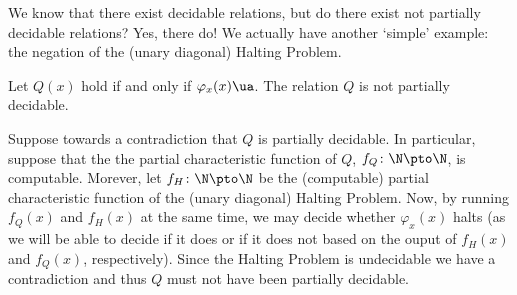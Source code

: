 \documentclass[class=article, crop=false]{standalone}
\begin{document}
We know that there exist decidable relations, but do there exist not partially decidable relations? Yes, there do! We actually have another `simple' example: the negation of the (unary diagonal) Halting Problem.
\begin{ex}
  Let $Q(x)$ hold if and only if $\varphi_x(x) \ua$. The relation $Q$ is not partially decidable.

  \begin{pf}
    Suppose towards a contradiction that $Q$ is partially decidable. In particular, suppose that the the partial characteristic function of $Q$, $f_Q \colon \N \pto \N$, is computable. Morever, let $f_H \colon \N \pto \N$ be the (computable) partial characteristic function of the (unary diagonal) Halting Problem. Now, by running $f_Q(x)$ and $f_H(x)$ at the same time, we may decide whether $\varphi_x(x)$ halts (as we will be able to decide if it does or if it does not based on the ouput of $f_H(x)$ and $f_Q(x)$, respectively). Since the Halting Problem is undecidable we have a contradiction and thus $Q$ must not have been partially decidable.
  \end{pf}
\end{ex}
\end{document}
